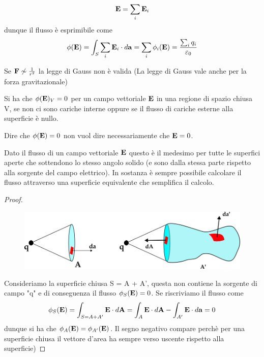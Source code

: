 \begin{equation*}
	\bold{E} = \sum_{i}\bold{E}_{i}
\end{equation*}
dunque il flusso \`e esprimibile come
\begin{equation*}
	\phi(\bold{E}) = \int_{S} \sum_{i} \bold{E}_i \cdot d\bold{a} = \sum_{i} \phi_i(\bold{E}) = \frac{\sum_{i}q_i}{\varepsilon_0}
\end{equation*}

\begin{prop}
	Se $\bold{F} \not\sim  \frac{1}{r^2}$ la legge di Gauss non \`e valida (La legge di Gauss vale anche per la forza gravitazionale)
\end{prop}
\noindent Si ha che $\phi(\bold{E})_V = 0$ per un campo vettoriale $\bold{E}$ in una regione di spazio chiusa V,  se non ci sono cariche interne oppure se il flusso di cariche esterne alla superficie \`e nullo.
\begin{remark}
Dire che $\phi(\bold{E}) = 0 $ non vuol dire necessariamente che $\bold{E} = 0$.	
\end{remark}
\begin{prop}
\noindent Dato il flusso di un campo vettoriale $\bold{E}$  questo \`e il medesimo per tutte le superfici aperte che sottendono lo stesso angolo solido (e sono dalla stessa parte rispetto alla sorgente del campo elettrico). In sostanza \`e sempre possibile calcolare il flusso attraverso una superficie equivalente che semplifica il calcolo.
\end{prop}

\begin{proof}
	 
\begin{figure}[!ht]
\vspace{0.1in}
\includegraphics[width = 12cm]{images/same}	
\centering
\vspace{0.1in}
\end{figure}
Consideriamo la superficie chiusa S = A + A', questa non contiene la sorgente di campo "q" e di conseguenza il flusso $\phi_{S}(\bold{E}) = 0$. Se riscriviamo il flusso come
\begin{equation*}
	\phi_S(\bold{E}) = \int_{S = A+A'} \bold{E} \cdot d\bold{A} = \int_{A} \bold{E} \cdot d\bold{A} - \int_{A'} \bold{E} \cdot d\bold{a} = 0
\end{equation*}
dunque si ha che $\phi_{A}(\bold{E}) = \phi_{A'}(\bold{E})$. Il segno negativo compare perch\`e per una superficie chiusa il vettore d'area ha sempre verso uscente rispetto alla superficie)

\end{proof}
\newpage

